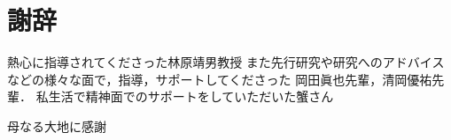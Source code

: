 \chapter*{謝辞}

熱心に指導されてくださった林原靖男教授
また先行研究や研究へのアドバイスなどの様々な面で，指導，サポートしてくださった
岡田眞也先輩，清岡優祐先輩．
私生活で精神面でのサポートをしていただいた蟹さん

母なる大地に感謝
